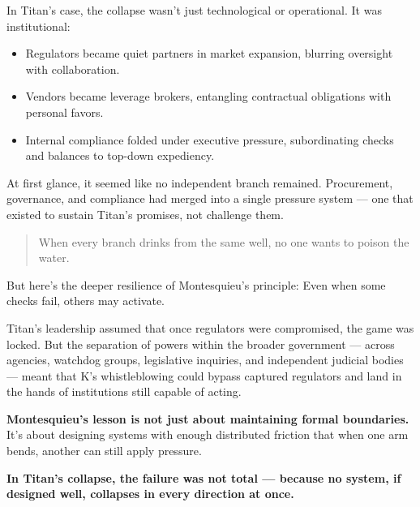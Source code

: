 \medskip

In Titan's case, the collapse wasn’t just technological or operational. It was institutional:

\begin{itemize}
    \item Regulators became quiet partners in market expansion, blurring oversight with collaboration.
    \item Vendors became leverage brokers, entangling contractual obligations with personal favors.
    \item Internal compliance folded under executive pressure, subordinating checks and balances to top-down expediency.
\end{itemize}

At first glance, it seemed like no independent branch remained. Procurement, governance, and compliance had merged into a single pressure system — one that existed to sustain Titan's promises, not challenge them.

\medskip

\begin{quote}
    When every branch drinks from the same well, no one wants to poison the water.
\end{quote}

But here’s the deeper resilience of Montesquieu’s principle:  
Even when some checks fail, others may activate.

\medskip

Titan’s leadership assumed that once regulators were compromised, the game was locked.  
But the separation of powers within the broader government — across agencies, watchdog groups, legislative inquiries, and independent judicial bodies — meant that K’s whistleblowing could bypass captured regulators and land in the hands of institutions still capable of acting.

\medskip

\textbf{Montesquieu’s lesson is not just about maintaining formal boundaries.}  
It’s about designing systems with enough distributed friction that when one arm bends, another can still apply pressure.

\medskip

\textbf{In Titan’s collapse, the failure was not total — because no system, if designed well, collapses in every direction at once.}

